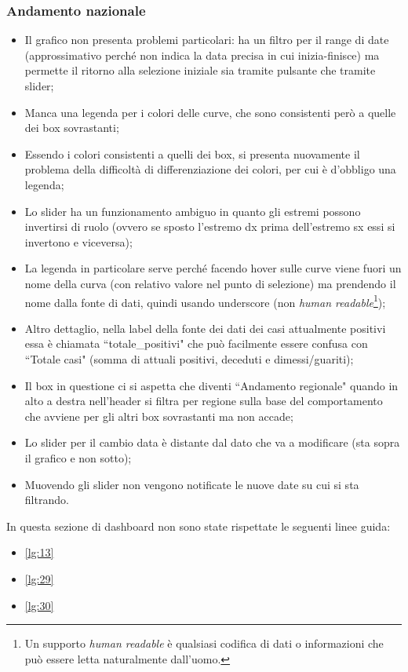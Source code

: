 \subsubsection{Andamento nazionale}
\begin{itemize}
    \item Il grafico non presenta problemi particolari: ha un filtro per il range di date (approssimativo perché non indica la data precisa in cui inizia-finisce) ma permette il ritorno alla selezione iniziale sia tramite pulsante che tramite slider;
    \item Manca una legenda per i colori delle curve, che sono consistenti però a quelle dei box sovrastanti;
    \item Essendo i colori consistenti a quelli dei box, si presenta nuovamente il problema della difficoltà di differenziazione dei colori, per cui è d'obbligo una legenda;
    \item Lo slider ha un funzionamento ambiguo in quanto gli estremi possono invertirsi di ruolo (ovvero se sposto l'estremo dx prima dell'estremo sx essi si invertono e viceversa);
    \item La legenda in particolare serve perché facendo hover sulle curve viene fuori un nome della curva (con relativo valore nel punto di selezione) ma prendendo il nome dalla fonte di dati, quindi usando underscore (non \textit{human readable}\footnote{Un supporto \textit{human readable} è qualsiasi codifica di dati o informazioni che può essere letta naturalmente dall'uomo.});
    \item Altro dettaglio, nella label della fonte dei dati dei casi attualmente positivi essa è chiamata ``totale\_positivi" che può facilmente essere confusa con ``Totale casi" (somma di attuali positivi, deceduti e dimessi/guariti);
    \item Il box in questione ci si aspetta che diventi ``Andamento regionale" quando in alto a destra nell'header si filtra per regione sulla base del comportamento che avviene per gli altri box sovrastanti ma non accade;
    \item Lo slider per il cambio data è distante dal dato che va a modificare (sta sopra il grafico e non sotto);
    \item Muovendo gli slider non vengono notificate le nuove date su cui si sta filtrando.
\end{itemize}
In questa sezione di dashboard non sono state rispettate le seguenti linee guida:
\begin{itemize}
    \item \ref{lg:13}
    \item \ref{lg:29}
    \item \ref{lg:30}
\end{itemize}

